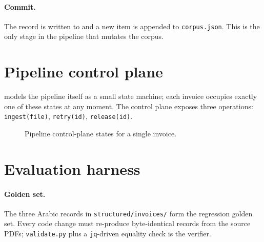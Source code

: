 \documentclass[11pt,a4paper,twoside]{report}
\newcommand{\corpus}{}
\begin{document}
\paragraph{Commit.} The record is written to
\corpus{} and a new item is
appended to \texttt{corpus.json}. This is the only stage in the
pipeline that mutates the corpus.

\section{Pipeline control plane}

 models the pipeline itself as a small state
machine; each invoice occupies exactly one of these states at any
moment. The control plane exposes three operations:
\texttt{ingest(file)}, \texttt{retry(id)}, \texttt{release(id)}.

\begin{figure}[htbp]
\centering
{}
\caption{Pipeline control-plane states for a single invoice.}
\label{fig:pipeline-states}
\end{figure}

\section{Evaluation harness}

\paragraph{Golden set.} The three Arabic records in
\corpus\texttt{structured/invoices/} form the regression golden set.
Every code change must re-produce byte-identical records from the
source PDFs; \texttt{validate.py} plus a \texttt{jq}-driven equality
check is the verifier.
\end{document}
